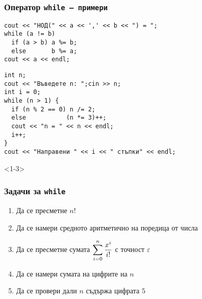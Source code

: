 \documentclass{beamer}
\newcommand{\expsum}{\displaystyle \sum_{i=0}^n \limits \frac{x^i}{i!}}
\begin{document}
\begin{frame}[fragile]
  \frametitle{Оператор \tt{while} --- примери}

\begin{lstlisting}
cout << "НОД(" << a << ',' << b << ") = ";
while (a != b)
  if (a > b) a %= b;
  else       b %= a;
cout << a << endl;
\end{lstlisting}
\pause
\begin{lstlisting}
int n;
cout << "Въведете n: ";cin >> n;
int i = 0;
while (n > 1) {
  if (n % 2 == 0) n /= 2;
  else           (n *= 3)++;
  cout << "n = " << n << endl;
  i++;
}
cout << "Направени " << i << " стъпки" << endl;
\end{lstlisting}
\end{frame}

\begin{frame}<1-3>
  \frametitle{Задачи за \tt{while}}
  
  \begin{enumerate}[<+->]
  \item Да се пресметне $n!$
  \item Да се намери средното аритметично на поредица от числа
  \item Да се пресметне сумата $\expsum$ с точност $\varepsilon$
  \item Да се намери сумата на цифрите на $n$
  \item Да се провери дали $n$ съдържа цифрата $5$
  \end{enumerate}
\end{frame}
\end{document}
